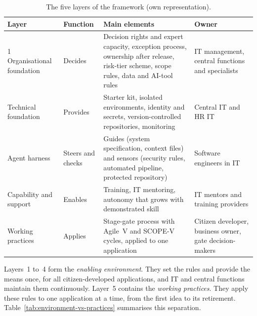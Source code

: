 \documentclass[10pt,a4paper]{article}
\begin{document}
\begin{table}[H]
    \centering
    \small
    \caption{The five layers of the framework (own representation).}
    \label{tab:framework-layers}
    \begin{tabular}{@{}p{3.0cm} p{1.9cm} p{5.6cm} p{3.4cm}@{}}
    \toprule
    \textbf{Layer} & \textbf{Function} & \textbf{Main elements} &
        \textbf{Owner} \\
    \midrule
    1 Organisational foundation & Decides & Decision rights and expert
        capacity, exception process, ownership after release, risk-tier
        scheme, scope rules, data and AI-tool rules & IT management,
        central functions and specialists \\
    \addlinespace
    2 Technical foundation & Provides & Starter kit, isolated
        environments, identity and secrets, version-controlled
        repositories, monitoring & Central IT and HR IT \\
    \addlinespace
    3 Agent harness & Steers and checks & Guides (system specification,
        context files) and sensors (security rules, automated pipeline,
        protected repository) & Software engineers in IT \\
    \addlinespace
    4 Capability and support & Enables & Training, IT mentoring,
        autonomy that grows with demonstrated skill & IT mentors and
        training providers \\
    \addlinespace
    5 Working practices & Applies & Stage-gate process with Agile~V and
        SCOPE-V cycles, applied to one application & Citizen developer,
        business owner, gate decision-makers \\
    \bottomrule
    \end{tabular}
\end{table}


Layers~1 to~4 form the \emph{enabling environment}. They set the rules
and provide the means once, for all citizen-developed applications, and
IT and central functions maintain them continuously. Layer~5 contains
the \emph{working practices}. They apply these rules to one application
at a time, from the first idea to its retirement.
Table~\ref{tab:environment-vs-practices} summarises this separation.
\end{document}
